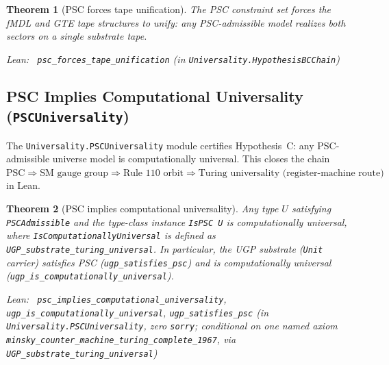 \documentclass[11pt,a4paper]{article}
\newenvironment{leanref}%
  {\par\smallskip\noindent\begingroup\raggedright\textup{Lean:}~}%
  {\par\endgroup}
\newtheorem{theorem}{Theorem}[section]
\theoremstyle{definition}
\begin{document}
\begin{theorem}[PSC forces tape unification]\label{thm:psc-tape-unify}
The PSC constraint set forces the fMDL and GTE tape structures to unify: any
PSC-admissible model realizes both sectors on a single substrate tape.

\begin{leanref}
\lstinline|psc_forces_tape_unification|
\textup{(in \texttt{Universality.HypothesisBCChain})}
\end{leanref}
\end{theorem}

\subsection{PSC Implies Computational Universality (\texttt{PSCUniversality})}\label{subsec:psc-universality}

The \texttt{Universality.PSCUniversality} module certifies Hypothesis~C: any PSC-admissible
universe model is computationally universal.  This closes the chain
$\text{PSC} \Rightarrow \text{SM gauge group} \Rightarrow \text{Rule 110 orbit}
\Rightarrow \text{Turing universality (register-machine route)}$ in Lean.

\begin{theorem}[PSC implies computational universality]\label{thm:psc-universality}
Any type $U$ satisfying \texttt{PSCAdmissible} and the type-class instance
\texttt{IsPSC U} is computationally universal, where \texttt{IsComputationallyUniversal}
is defined as \lstinline|UGP_substrate_turing_universal|.
In particular, the UGP substrate (\texttt{Unit} carrier) satisfies PSC
(\lstinline|ugp_satisfies_psc|) and is computationally universal
(\lstinline|ugp_is_computationally_universal|).

\begin{leanref}
\lstinline|psc_implies_computational_universality|,
\lstinline|ugp_is_computationally_universal|,
\lstinline|ugp_satisfies_psc|
\textup{(in \texttt{Universality.PSCUniversality}, zero \texttt{sorry}; conditional on
one named axiom \texttt{minsky\_counter\_machine\_turing\_complete\_1967}, via
\lstinline|UGP_substrate_turing_universal|)}
\end{leanref}
\end{theorem}
\end{document}
